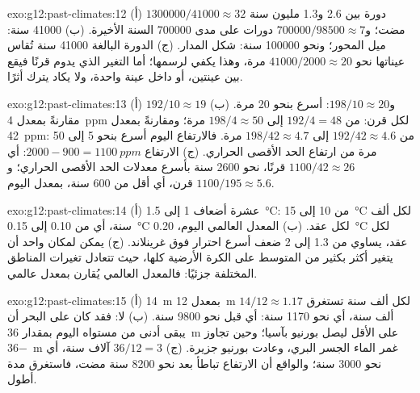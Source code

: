 \begin{solution}{exo:g12:past-climates:12}
(أ) $\num{1300000}/\num{41000} \approx 32$ دورة بين 2.6 و1.3
مليون سنة مضت؛ و$\num{700000}/\num{98500} \approx 7$ دورات على مدى
\num{700000} السنة الأخيرة. (ب) \num{41000} سنة: ميل المحور؛ ونحو
\num{100000} سنة: شكل المدار. (ج) الدورة البالغة \num{41000} سنة
تُقاس عيناتها نحو $\num{41000}/\num{2000} \approx 20$ مرة، وهذا يكفي لرسمها؛
أما التغير الذي يدوم قرنًا فيقع بين عينتين، أو داخل عينة واحدة،
ولا يكاد يترك أثرًا.
\end{solution}

\begin{solution}{exo:g12:past-climates:13}
(أ) $192/10 \approx 19$ و$198/10 \approx 20$: أسرع بنحو 20 مرة.
(ب) مقارنةً بمعدل \qty{4}{ppm} لكل قرن: من $192/4 = 48$ إلى $198/4 \approx 50$
مرة؛ ومقارنةً بمعدل \qty{42}{ppm}: من $192/42 \approx 4.6$ إلى $198/42 \approx 4.7$
مرة. فالارتفاع اليوم أسرع بنحو 5 إلى 50 مرة من ارتفاع الحد الأقصى الحراري.
(ج) الارتفاع $2000 - 900 = \qty{1100}{ppm}$: أي $1100/42 \approx 26$ قرنًا،
نحو \num{2600} سنة بأسرع معدلات الحد الأقصى الحراري؛ و$1100/195 \approx 5.6$
قرن، أي أقل من 600 سنة، بمعدل اليوم.
\end{solution}

\begin{solution}{exo:g12:past-climates:14}
(أ) عشرة أضعاف 1 إلى \qty{1.5}{\degreeCelsius}: من 10 إلى \qty{15}{\degreeCelsius}
لكل ألف سنة، أي من 0.10 إلى \qty{0.15}{\degreeCelsius} لكل عقد.
(ب) المعدل العالمي اليوم، \qty{0.20}{\degreeCelsius} لكل عقد، يساوي من 1.3 إلى 2
ضعف أسرع احترار فوق غرينلاند. (ج) يمكن لمكان واحد أن يتغير أكثر بكثير
من المتوسط على الكرة الأرضية كلها، حيث تتعادل تغيرات المناطق المختلفة
جزئيًا: فالمعدل العالمي يُقارن بمعدل عالمي.
\end{solution}

\begin{solution}{exo:g12:past-climates:15}
(أ) \qty{14}{m} بمعدل \qty{12}{m} لكل ألف سنة تستغرق $14/12 \approx
1.17$ ألف سنة، أي نحو \num{1170} سنة: أي قبل نحو \num{9800} سنة.
(ب) لا: فقد كان على البحر أن يبقى أدنى من مستواه اليوم بمقدار \qty{36}{m} على الأقل ليصل
بورنيو بآسيا؛ وحين تجاوز \qty{-36}{m} غمر الماء الجسر البري،
وعادت بورنيو جزيرة. (ج) $36/12 = 3$ آلاف سنة، أي نحو
\num{3000} سنة؛ والواقع أن الارتفاع تباطأ بعد نحو \num{8200} سنة
مضت، فاستغرق مدة أطول.
\end{solution}

